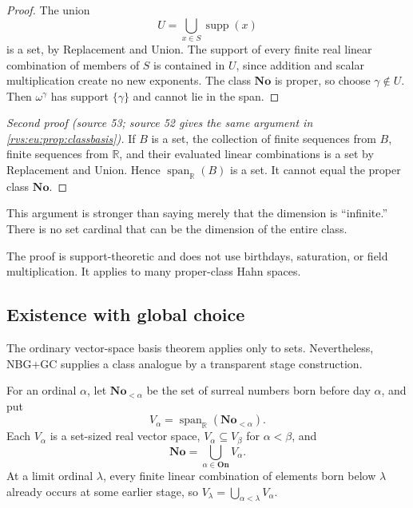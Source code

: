 \documentclass[11pt,letterpaper]{article}
\numberwithin{equation}{section}
\newtheorem{corollary}[theorem]{Corollary}
\theoremstyle{definition}
\theoremstyle{remark}
\newcommand{\No}{\mathbf{No}}
\newcommand{\On}{\mathbf{On}}
\newcommand{\R}{\mathbb{R}}
\newcommand{\supp}{\operatorname{supp}}
\newcommand{\Span}{\operatorname{span}}
\begin{document}
\begin{proof}
The union
\[
  U=\bigcup_{x\in S}\supp(x)
\]
is a set, by Replacement and Union.  The support of every finite real linear
combination of members of \(S\) is contained in \(U\), since addition and
scalar multiplication create no new exponents.  The class \(\No\) is proper,
so choose \(\gamma\notin U\).  Then \(\omega^\gamma\) has support
\(\{\gamma\}\) and cannot lie in the span.
\end{proof}


\begin{proof}[Second proof (source 53; source 52 gives the same argument in \cref{rvs:eu:prop:classbasis})]

If $B$ is a set, the collection of finite sequences from $B$, finite sequences
from $\R$, and their evaluated linear combinations is a set by Replacement and
Union. Hence $\Span_{\R}(B)$ is a set. It cannot equal the proper class $\No$.
\end{proof}

This argument is stronger than saying merely that the dimension is ``infinite.''
There is no set cardinal that can be the dimension of the entire class.

The proof is support-theoretic and does not use birthdays, saturation, or
field multiplication.  It applies to many proper-class Hahn spaces.

\subsection{Existence with global choice}\label{rvs:subsec:basis-existence}

The ordinary vector-space basis theorem applies only to sets.  Nevertheless,
NBG+GC supplies a class analogue by a transparent stage construction.

For an ordinal \(\alpha\), let \(\No_{<\alpha}\) be the set of surreal
numbers born before day \(\alpha\), and put
\begin{equation}\label{rvs:eq:Valpha}
  V_\alpha=\Span_{\R}(\No_{<\alpha}).
\end{equation}
Each \(V_\alpha\) is a set-sized real vector space,
\(V_\alpha\subseteq V_\beta\) for \(\alpha<\beta\), and
\begin{equation}\label{rvs:eq:union-Va}
  \No=\bigcup_{\alpha\in\On}V_\alpha.
\end{equation}
At a limit ordinal \(\lambda\), every finite linear combination of elements
born below \(\lambda\) already occurs at some earlier stage, so
\(V_\lambda=\bigcup_{\alpha<\lambda}V_\alpha\).
\end{document}
